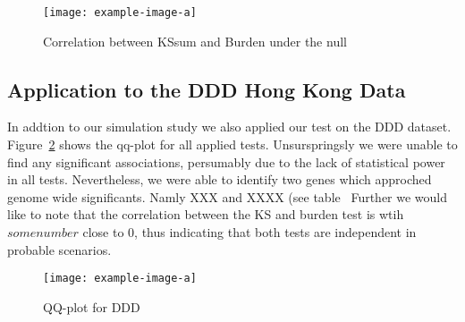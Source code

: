 \begin{figure}[ht!]
	\centering
	\texttt{[image: example-image-a]}
	\caption{\label{fig:nullCor} Correlation between KSsum and Burden under the null}
\end{figure}

\subsection{Application to the DDD Hong Kong Data}
\label{sub:application_to_the_ddd_hong_kong_data}

In addtion to our simulation study we also applied our test on the DDD dataset.
Figure~\ref{fig:ddd} shows the qq-plot for all applied tests.
Unsurspringsly we were unable to find any significant associations, persumably due to the lack of statistical power in all tests.
Nevertheless, we were able to identify two genes which approched genome wide significants.
Namly XXX and XXXX (see table~%
Further we would like to note that the correlation between the KS and burden test is wtih $somenumber$ close to $0$, thus indicating that both tests are independent in probable scenarios.

\begin{figure}[ht!]
	\centering
	\texttt{[image: example-image-a]}
	\caption{\label{fig:ddd} QQ-plot for DDD}
\end{figure}
